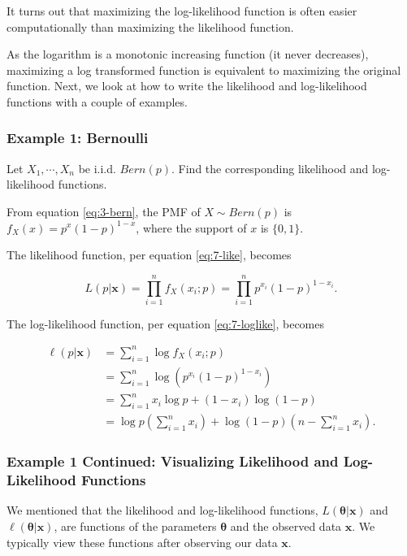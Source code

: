 \documentclass[
]{book}
\begin{document}
It turns out that maximizing the log-likelihood function is often easier computationally than maximizing the likelihood function.

As the logarithm is a monotonic increasing function (it never decreases), maximizing a log transformed function is equivalent to maximizing the original function. Next, we look at how to write the likelihood and log-likelihood functions with a couple of examples.

\hypertarget{example-1-bernoulli}{%
\subsubsection{Example 1: Bernoulli}\label{example-1-bernoulli}}

Let \(X_1, \cdots, X_n\) be i.i.d. \(Bern(p)\). Find the corresponding likelihood and log-likelihood functions.

From equation \eqref{eq:3-bern}, the PMF of \(X \sim Bern(p)\) is \(f_X(x) = p^x (1-p)^{1-x}\), where the support of \(x\) is \(\{0,1\}\).

The likelihood function, per equation \eqref{eq:7-like}, becomes

\[
L(p | \boldsymbol{x} ) = \prod_{i=1}^n f_X(x_i; p) = \prod_{i=1}^n p^{x_i} (1-p)^{1-x_i}.
\]

The log-likelihood function, per equation \eqref{eq:7-loglike}, becomes

\[
\begin{split}
\ell (p | \boldsymbol{x}) &= \sum_{i=1}^n \log f_X(x_i;p) \\
                          &= \sum_{i=1}^n \log \left( p^{x_i} (1-p)^{1-x_i} \right) \\
                          &= \sum_{i=1}^n x_i \log p + (1-x_i) \log (1-p) \\
                          &= \log p \left(\sum_{i=1}^n x_i \right) + \log (1-p) \left( n - \sum_{i=1}^n x_i \right).
\end{split}
\]

\hypertarget{example-1-continued-visualizing-likelihood-and-log-likelihood-functions}{%
\subsubsection{Example 1 Continued: Visualizing Likelihood and Log-Likelihood Functions}\label{example-1-continued-visualizing-likelihood-and-log-likelihood-functions}}

We mentioned that the likelihood and log-likelihood functions, \(L(\boldsymbol{\theta} | \boldsymbol{x} )\) and \(\ell(\boldsymbol{\theta} | \boldsymbol{x} )\), are functions of the parameters \(\boldsymbol{\theta}\) and the observed data \(\boldsymbol{x}\). We typically view these functions after observing our data \(\boldsymbol{x}\).
\end{document}
